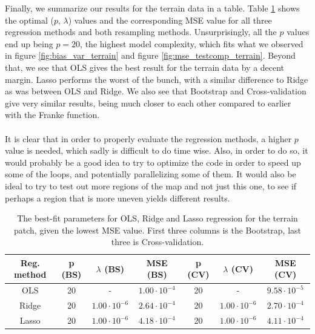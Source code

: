 \documentclass[a4paper]{article}
\begin{document}
Finally, we summarize our results for the terrain data in a table. Table \ref{tab:best_fit_terrain} shows the optimal ($p$, $\lambda$) values and the corresponding MSE value for all three regression methods and both resampling methods. Unsurprisingly, all the $p$ values end up being $p=20$, the highest model complexity, which fits what we observed in figure \ref{fig:bias_var_terrain} and figure \ref{fig:mse_testcomp_terrain}. Beyond that, we see that OLS gives the best result for the terrain data by a decent margin. Lasso performs the worst of the bunch, with a similar difference to Ridge as was between OLS and Ridge. We also see that Bootstrap and Cross-validation give very similar results, being much closer to each other compared to earlier with the Franke function.
\\\\
It is clear that in order to properly evaluate the regression methods, a higher $p$ value is needed, which sadly is difficult to do time wise. Also, in order to do so, it would probably be a good idea to try to optimize the code in order to speed up some of the loops, and potentially parallelizing some of them. It would also be ideal to try to test out more regions of the map and not just this one, to see if perhaps a region that is more uneven yields different results.
\begin{table}[H]
  \centering
  \caption{The best-fit parameters for OLS, Ridge and Lasso regression for the terrain patch, given the lowest MSE value. First three columns is the Bootstrap, last three is Cross-validation.}
  \label{tab:best_fit_terrain}
  \begin{tabular}{c|c|c|c||c|c|c}
    Reg. method & p (BS)& $\lambda$ (BS) & MSE (BS) & p (CV) & $\lambda$ (CV) & MSE (CV) \\\hline
    OLS & 20 & - & $1.00\cdot10^{-4}$ & 20 & - & $9.58\cdot10^{-5}$\\
    Ridge & 20 & $1.00\cdot10^{-6}$ & $2.64\cdot10^{-4}$ & 20 & $1.00\cdot10^{-6}$ & $2.70\cdot10^{-4}$\\
    Lasso & 20 & $1.00\cdot10^{-6}$ &$4.18\cdot10^{-4}$ & 20 & $1.00\cdot10^{-6}$ & $4.11\cdot10^{-4}$
    \end{tabular}
\end{table}
\end{document}
